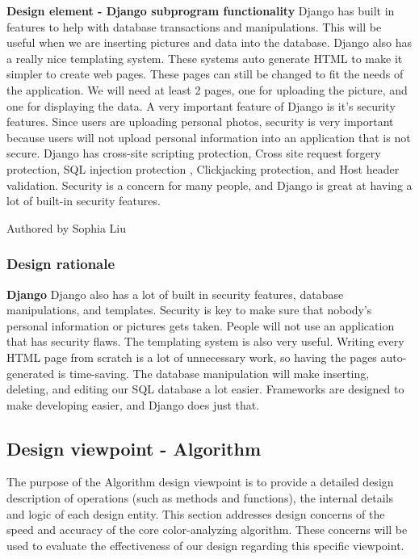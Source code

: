 \documentclass[onecolumn, draftclsnofoot,10pt, compsoc]{IEEEtran}
\begin{document}
\begin{flushleft}
\medskip

\textbf{Design element - Django subprogram functionality} Django has built in features to help with database transactions and manipulations. This will be useful when we are inserting pictures and data into the database. Django also has a really nice templating system. These systems auto generate HTML to make it simpler to create web pages. These pages can still be changed to fit the needs of the application. We will need at least 2 pages, one for uploading the picture, and one for displaying the data. A very important feature of Django is it’s security features. Since users are uploading personal photos, security is very important because users will not upload personal information into an application that is not secure. Django has cross-site scripting protection, Cross site request forgery protection, SQL injection protection
, Clickjacking protection, and Host header validation. \cite{8} Security is a concern for many people, and Django is great at having a lot of built-in security features.

\smallskip
\footnotesize Authored by Sophia Liu
\normalsize

\bigskip

\subsubsection{Design rationale}
\textbf{Django}  Django also has a lot of built in security features, database manipulations, and templates. Security is key to make sure that nobody’s personal information or pictures gets taken. People will not use an application that has security flaws. The templating system is also very useful. Writing every HTML page from scratch is a lot of unnecessary work, so having the pages auto-generated is time-saving. The database manipulation will make inserting, deleting, and editing our SQL database a lot easier. Frameworks are designed to make developing easier, and Django does just that.
\medskip

\subsection{Design viewpoint - Algorithm}
The purpose of the Algorithm design viewpoint is to provide a detailed design description of operations (such as methods and functions), the internal details and logic of each design entity. This section addresses design concerns of the speed and accuracy of the core color-analyzing algorithm. These concerns will be used to evaluate the effectiveness of our design regarding this specific viewpoint.


\end{flushleft}
\end{document}

